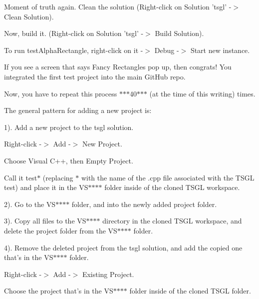Moment of truth again. Clean the solution ({\ttfamily Right-\/click on Solution 'tsgl' -\/$>$ Clean Solution}).

Now, build it. ({\ttfamily Right-\/click on Solution 'tsgl' -\/$>$ Build Solution}).

To run {\ttfamily test\-Alpha\-Rectangle}, right-\/click on it -\/$>$ {\ttfamily Debug} -\/$>$ {\ttfamily Start new instance}.

If you see a screen that says {\ttfamily Fancy Rectangles} pop up, then congrats! You integrated the first test project into the main Git\-Hub repo.

Now, you have to repeat this process $\ast$$\ast$$\ast$40$\ast$$\ast$$\ast$ (at the time of this writing) times.

The general pattern for adding a new project is\-:

1). Add a new project to the {\ttfamily tsgl} solution.


\begin{DoxyItemize}
\item {\ttfamily Right-\/click -\/$>$ Add -\/$>$ New Project}.
\item Choose {\ttfamily Visual C++}, then {\ttfamily Empty Project}.
\item Call it {\ttfamily test$\ast$} (replacing {\ttfamily $\ast$} with the name of the {\ttfamily .cpp} file associated with the T\-S\-G\-L test) and place it in the {\ttfamily V\-S$\ast$$\ast$$\ast$$\ast$} folder inside of the cloned T\-S\-G\-L workspace.
\end{DoxyItemize}

2). Go to the {\ttfamily V\-S$\ast$$\ast$$\ast$$\ast$} folder, and into the newly added project folder.

3). Copy all files to the {\ttfamily V\-S$\ast$$\ast$$\ast$$\ast$} directory in the cloned T\-S\-G\-L workspace, and delete the project folder from the {\ttfamily V\-S$\ast$$\ast$$\ast$$\ast$} folder.

4). Remove the deleted project from the {\ttfamily tsgl} solution, and add the copied one that's in the {\ttfamily V\-S$\ast$$\ast$$\ast$$\ast$} folder.


\begin{DoxyItemize}
\item {\ttfamily Right-\/click -\/$>$ Add -\/$>$ Existing Project}.
\item Choose the project that's in the {\ttfamily V\-S$\ast$$\ast$$\ast$$\ast$} folder inside of the cloned T\-S\-G\-L folder.
\end{DoxyItemize}

